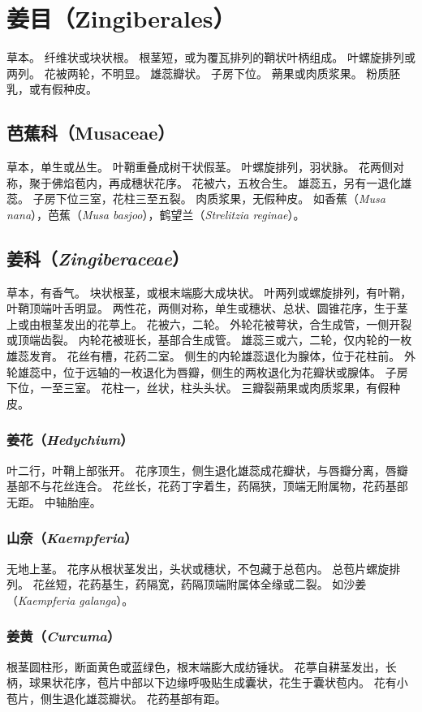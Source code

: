 \documentclass[11pt]{article}
\begin{document}
\begin{sloppypar}
\section{姜目（Zingiberales）}
草本。
纤维状或块状根。
根茎短，或为覆瓦排列的鞘状叶柄组成。
叶螺旋排列或两列。
花被两轮，不明显。
雄蕊瓣状。
子房下位。
蒴果或肉质浆果。
粉质胚乳，或有假种皮。

\subsection{芭蕉科（Musaceae）}
草本，单生或丛生。
叶鞘重叠成树干状假茎。
叶螺旋排列，羽状脉。
花两侧对称，聚于佛焰苞内，再成穗状花序。
花被六，五枚合生。
雄蕊五，另有一退化雄蕊。
子房下位三室，花柱三至五裂。
肉质浆果，无假种皮。
如香蕉（\textit{Musa nana}），芭蕉（\textit{Musa basjoo}），鹤望兰（\textit{Strelitzia reginae}）。

\subsection{姜科（\textit{Zingiberaceae}）}
草本，有香气。
块状根茎，或根末端膨大成块状。
叶两列或螺旋排列，有叶鞘，叶鞘顶端叶舌明显。
两性花，两侧对称，单生或穗状、总状、圆锥花序，生于茎上或由根茎发出的花葶上。
花被六，二轮。
外轮花被萼状，合生成管，一侧开裂或顶端齿裂。
内轮花被班长，基部合生成管。
雄蕊三或六，二轮，仅内轮的一枚雄蕊发育。
花丝有槽，花药二室。
侧生的内轮雄蕊退化为腺体，位于花柱前。
外轮雄蕊中，位于远轴的一枚退化为唇瓣，侧生的两枚退化为花瓣状或腺体。
子房下位，一至三室。
花柱一，丝状，柱头头状。
三瓣裂蒴果或肉质浆果，有假种皮。

\subsubsection{姜花（\textit{Hedychium}）}
叶二行，叶鞘上部张开。
花序顶生，侧生退化雄蕊成花瓣状，与唇瓣分离，唇瓣基部不与花丝连合。
花丝长，花药丁字着生，药隔狭，顶端无附属物，花药基部无距。
中轴胎座。

\subsubsection{山奈（\textit{Kaempferia}）}
无地上茎。
花序从根状茎发出，头状或穗状，不包藏于总苞内。
总苞片螺旋排列。
花丝短，花药基生，药隔宽，药隔顶端附属体全缘或二裂。
如沙姜（\textit{Kaempferia galanga}）。

\subsubsection{姜黄（\textit{Curcuma}）}
根茎圆柱形，断面黄色或蓝绿色，根末端膨大成纺锤状。
花葶自耕茎发出，长柄，球果状花序，苞片中部以下边缘呼吸贴生成囊状，花生于囊状苞内。
花有小苞片，侧生退化雄蕊瓣状。
花药基部有距。


\end{sloppypar}
\end{document}
